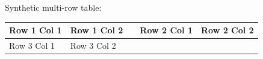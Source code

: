 \documentclass[11pt,a4paper]{article}
\begin{document}
Synthetic multi-row table:

\begin{table}[h]
\begin{tabular}{|l|l|l|l|l|}
\hline
Row 1 Col 1 & Row 1 Col 2 &  & Row 2 Col 1 & Row 2 Col 2 \\ \hline
Row 3 Col 1 & Row 3 Col 2 &  &  &  \\ \hline
\end{tabular}
\end{table}
\end{document}
